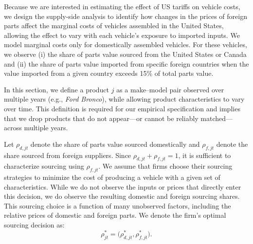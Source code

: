 \documentclass[11pt]{article}
\begin{document}
Because we are interested in estimating the effect of US tariffs on vehicle costs, we design the supply-side analysis to identify how changes in the prices of foreign parts affect the marginal costs of vehicles assembled in the United States, allowing the effect to vary with each vehicle’s exposure to imported inputs. We model marginal costs only for domestically assembled vehicles. For these vehicles, we observe (i) the share of parts value sourced from the United States or Canada and (ii) the share of parts value imported from specific foreign countries when the value imported from a given country exceeds 15\% of total parts value.

In this section, we define a product \(j\) as a make–model pair observed over multiple years (e.g., \emph{Ford Bronco}), while allowing product characteristics to vary over time. This definition is required for our empirical specification and implies that we drop products that do not appear—or cannot be reliably matched—across multiple years.

Let \(\rho_{d,jt}\) denote the share of parts value sourced domestically and \(\rho_{f,jt}\) denote the share sourced from foreign suppliers. Since \(\rho_{d,jt} + \rho_{f,jt} = 1\), it is sufficient to characterize sourcing using \(\rho_{f,jt}\). We assume that firms choose their sourcing strategies to minimize the cost of producing a vehicle with a given set of characteristics. While we do not observe the inputs or prices that directly enter this decision, we do observe the resulting domestic and foreign sourcing shares. This sourcing choice is a function of many unobserved factors, including the relative prices of domestic and foreign parts. We denote the firm’s optimal sourcing decision as:
\[
\rho_{jt}^* = \bigl(\rho_{d,jt}^*, \rho_{f,jt}^*\bigr).
\]
\end{document}
